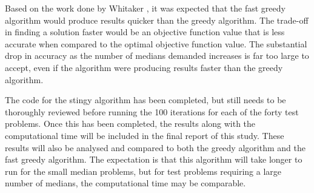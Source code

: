 \documentclass[11pt]{article}
\begin{document}
	Based on the work done by Whitaker \cite{WHIT83},  it was expected that the fast greedy algorithm would produce results quicker than the greedy algorithm.  The trade-off in finding a solution faster would be an objective function value that is less accurate when compared to the optimal objective function value.  The substantial drop in accuracy as the number of medians demanded increases is far too large to accept, even if the algorithm were producing results faster than the greedy algorithm.
	
	The code for the stingy algorithm has been completed, but still needs to be thoroughly reviewed before running the 100 iterations for each of the forty test problems.  Once this has been completed, the results along with the computational time will be included in the final report of this study.  These results will also be analysed and compared to both the greedy algorithm and the fast greedy algorithm.  The expectation is that this algorithm will take longer to run for the small median problems, but for test problems requiring a large number of medians, the computational time may be comparable.  
	
\end{document}
